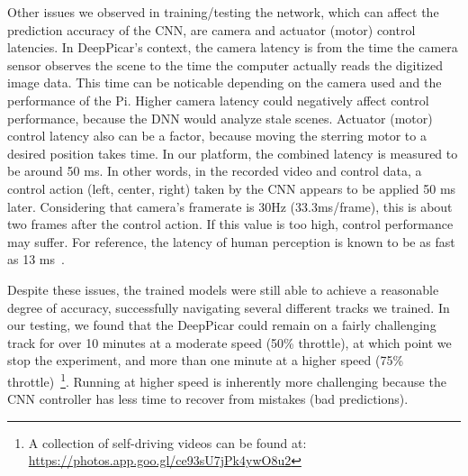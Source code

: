 Other issues we observed in training/testing the network, which
can affect the prediction accuracy of the CNN, are camera and actuator
(motor) control latencies. In DeepPicar's
context, the camera latency is from the time the camera
sensor observes the scene to the time the computer actually reads the
digitized image data. This time can be noticable depending on the camera 
used and the performance of the Pi. Higher camera latency could
negatively affect control performance, because the DNN would analyze
stale scenes. Actuator (motor) control latency also can be a
factor, because moving the sterring motor to a desired position takes
time. 
In our platform, the combined latency is measured to be around
50 ms. In other words, in the recorded video and control data, a
control action (left, center, right) taken by the CNN appears to be
applied 50 ms later. Considering that camera's framerate is 30Hz
(33.3ms/frame), this is about two frames after the control action.
If this value is too high, control performance may suffer. 
For reference, the latency of human perception is known to be as fast
as 13 ms~\cite{ThomasBurger2015}.

Despite these issues, the trained models were still able to
achieve a reasonable degree of accuracy, successfully navigating
several different tracks we trained. In our testing, we found that the
DeepPicar could remain on a fairly challenging track for over 10
minutes at a moderate speed (50\% throttle), at which point we stop
the experiment, and more than one minute at a higher speed (75\%
throttle)~\footnote{A collection of self-driving videos can be found
  at: \url{https://photos.app.goo.gl/ce93sU7jPk4ywO8u2}}. Running at
higher speed is inherently more challenging because the CNN controller
has less time to recover from mistakes (bad predictions).
